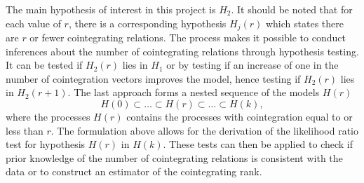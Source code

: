 \noindent The main hypothesis of interest in this project is $H_2$. It should be noted that for each value of $r$, there is a corresponding hypothesis $H_j(r)$ which states there are $r$ or fewer cointegrating relations. 
 \newline
 The process makes it possible to conduct inferences about the number of cointegrating relations through hypothesis testing. It can be tested if $H_2(r)$ lies in $H_1$ or by testing if an increase of one in the number of cointegration vectors improves the model, hence testing if $H_2(r)$ lies in $H_2(r+1)$. The last approach forms a nested sequence of the models $H(r)$
\begin{equation*}
    H(0) \subset \dots \subset H(r) \subset \dots \subset H(k),
\end{equation*}
where the processes $H(r)$ contains the processes with cointegration equal to or less than $r$. The formulation above allows for the derivation of the likelihood ratio test for hypothesis $H(r)$ in $H(k)$. These tests can then be applied to check if prior knowledge of the number of cointegrating relations is consistent with the data or to construct an estimator of the cointegrating rank.



